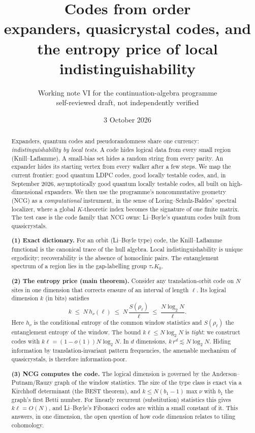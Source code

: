 \documentclass[11pt]{article}
\title{Codes from order\\[4pt]
\large expanders, quasicrystal codes, and the entropy price of local indistinguishability}
\author{Working note VI for the continuation-algebra programme\\
\small self-reviewed draft, not independently verified}
\date{3 October 2026}
\theoremstyle{definition}
\theoremstyle{remark}
\begin{document}
\maketitle

\begin{abstract}
Expanders, quantum codes and pseudorandomness share one currency: \emph{indistinguishability by local tests}. A code hides logical data from every small region (Knill--Laflamme). A small-bias set hides a random string from every parity. An expander hides its starting vertex from every walker after a few steps. We map the current frontier: good quantum LDPC codes, good locally testable codes, and, in September 2026, asymptotically good quantum locally testable codes, all built on high-dimensional expanders. We then use the programme's noncommutative geometry (NCG) as a \emph{computational} instrument, in the sense of Loring--Schulz-Baldes' spectral localizer, where a global $K$-theoretic index becomes the signature of one finite matrix. The test case is the code family that NCG owns: Li--Boyle's quantum codes built from quasicrystals.

\textbf{(1) Exact dictionary.} For an orbit (Li--Boyle type) code, the Knill--Laflamme functional is the canonical trace of the hull algebra. Local indistinguishability is unique ergodicity; recoverability is the absence of homoclinic pairs. The entanglement spectrum of a region lies in the gap-labelling group $\tau_*K_0$.

\textbf{(2) The entropy price (main theorem).} Consider any translation-orbit code on $N$ sites in one dimension that corrects erasure of an interval of length $\ell$. Its logical dimension $k$ (in bits) satisfies
\[k\;\le\;N\,h_\nu(\ell)\;\le\;N\,\frac{S(\rho_\ell)}{\ell}\;\le\;\frac{N\log_2N}{\ell}.\]
Here $h_\nu$ is the conditional entropy of the common window statistics and $S(\rho_\ell)$ the entanglement entropy of the window. The bound $k\ell\le N\log_2N$ is \emph{tight}: we construct codes with $k\ell=(1-o(1))N\log_2N$. In $d$ dimensions, $k\,r^d\lesssim N\log_2N$. Hiding information by translation-invariant pattern frequencies, the amenable mechanism of quasicrystals, is therefore information-poor.

\textbf{(3) NCG computes the code.} The logical dimension is governed by the Anderson--Putnam/Rauzy graph of the window statistics. The size of the type class is exact via a Kirchhoff determinant (the BEST theorem), and $k\le N(b_1-1)\max\nu$ with $b_1$ the graph's first Betti number. For linearly recurrent (substitution) statistics this gives $k\ell=O(N)$, and Li--Boyle's Fibonacci codes are within a small constant of it. This answers, in one dimension, the open question of how code dimension relates to tiling cohomology.


\end{abstract}
\end{document}
